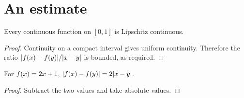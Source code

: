 \section{An estimate}
\begin{theorem}\label{thm:regularity}
Every continuous function on $[0,1]$ is Lipschitz continuous.
\end{theorem}
\begin{proof}
Continuity on a compact interval gives uniform continuity. Therefore the
ratio $|f(x)-f(y)|/|x-y|$ is bounded, as required.
\end{proof}
\begin{theorem}\label{thm:linear}
For $f(x)=2x+1$, $|f(x)-f(y)|=2|x-y|$.
\end{theorem}
\begin{proof}
Subtract the two values and take absolute values.
\end{proof}
